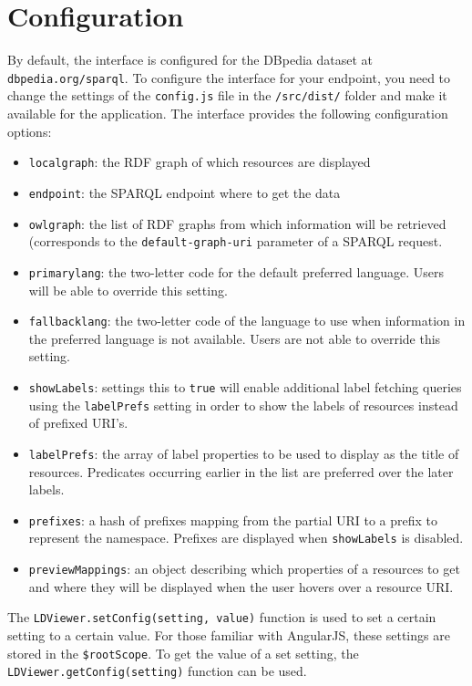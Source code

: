 \documentclass{book}
\begin{document}
\section{Configuration}
\label{sec:deploy}
By default, the interface is configured for the DBpedia dataset at \texttt{dbpedia.org/sparql}.
To configure the interface for your endpoint, you need to change the settings of the \texttt{config.js} file in the \texttt{/src/dist/} folder and make it available for the application.
The interface provides the following configuration options:
\begin{itemize}
\item \texttt{localgraph}: the RDF graph of which resources are displayed
\item \texttt{endpoint}: the SPARQL endpoint where to get the data
\item \texttt{owlgraph}: the list of RDF graphs from which information will be retrieved (corresponds to the \texttt{default-graph-uri} parameter of a SPARQL request.
\item \texttt{primarylang}: the two-letter code for the default preferred language. Users will be able to override this setting.
\item \texttt{fallbacklang}: the two-letter code of the language to use when information in the preferred language is not available. Users are not able to override this setting.
\item \texttt{showLabels}: settings this to \texttt{true} will enable additional label fetching queries using the \texttt{labelPrefs} setting in order to show the labels of resources instead of prefixed URI's.
\item \texttt{labelPrefs}: the array of label properties to be used to display as the title of resources. Predicates occurring earlier in the list are preferred over the later labels.
\item \texttt{prefixes}: a hash of prefixes mapping from the partial URI to a prefix to represent the namespace. Prefixes are displayed when \texttt{showLabels} is disabled.
\item \texttt{previewMappings}: an object describing which properties of a resources to get and where they will be displayed when the user hovers over a resource URI.
\end{itemize}

The \texttt{LDViewer.setConfig(setting, value)} function is used to set a certain setting to a certain value. For those familiar with AngularJS, these settings are stored in the \texttt{\$rootScope}.
To get the value of a set setting, the \texttt{LDViewer.getConfig(setting)} function can be used.
\end{document}
